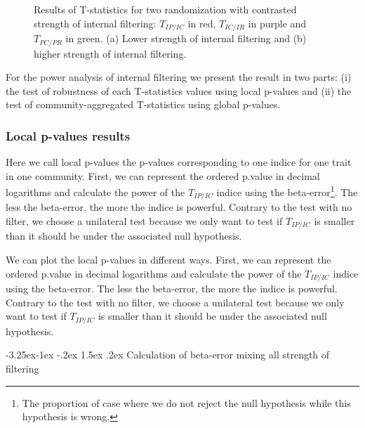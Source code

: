 \documentclass[12pt]{article}\usepackage[]{graphicx}\usepackage[]{color}
\makeatletter
\newenvironment{knitrout}{}{} %
\newcounter {subsubsubsection}[subsubsection]
\newcommand\subsubsubsection{\@startsection{subsubsubsection}{4}{\z@}%
          {-3.25ex\@plus -1ex \@minus -.2ex}%
          {1.5ex \@plus .2ex}%
          {\normalfont\normalsize\bfseries}}
\makeatother
\begin{document}
\begin{knitrout}
\begin{figure}
{}

\caption[Results of T-statistics for two randomization with contrasted strength of internal filtering]{Results of T-statistics for two randomization with contrasted strength of internal filtering: $T_{IP/IC}$ in red, $T_{IC/IR}$ in purple and $T_{PC/PR}$ in green. (a) Lower strength of internal filtering and (b) higher strength of internal filtering.}\label{fig:typical_result_internal_filtering2}
\end{figure}


\end{knitrout}

For the power analysis of internal filtering we present the result in two parts: (i) the test of robustness of each T-statistics values using local p-values and (ii) the test of community-aggregated T-statistics using global p-values.

 \subsubsection {Local p-values results}

Here we call local p-values the p-values corresponding to one indice for one trait in one community. First, we can represent the ordered p.value in decimal logarithms and calculate the power of the $T_{IP/IC}$ indice using the beta-error\footnote{The proportion of case where we do not reject the null hypothesis while this hypothesis is wrong.}. The less the beta-error, the more the indice is powerful. Contrary to the test with no filter, we choose a unilateral test because we only want to test if $T_{IP/IC}$ is smaller than it should be under the associated null hypothesis.

We can plot the local p-values in different ways. First, we can represent the ordered p.value in decimal logarithms and calculate the power of the $T_{IP/IC}$ indice using the beta-error. The less the beta-error, the more the indice is powerful. Contrary to the test with no filter, we choose a unilateral test because we only want to test if $T_{IP/IC}$ is smaller than it should be under the associated null hypothesis.

  \subsubsubsection {Calculation of beta-error mixing all strength of filtering}
 
\end{document}
